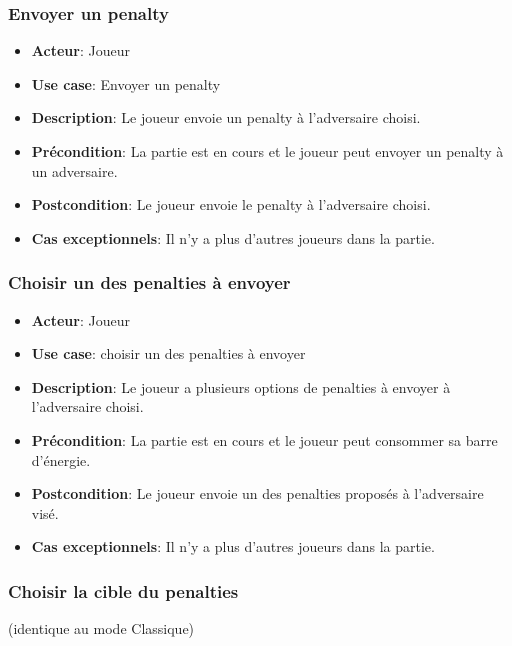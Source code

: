 \documentclass{article}
\begin{document}
\subsubsection*{Envoyer un penalty}
\begin{itemize}
    \item \textbf{Acteur}: Joueur
    \item \textbf{Use case}: Envoyer un penalty
    \item \textbf{Description}: Le joueur envoie un penalty à l'adversaire choisi.
    \item \textbf{Précondition}: La partie est en cours et le joueur peut envoyer un penalty à un adversaire.
    \item \textbf{Postcondition}: Le joueur envoie le penalty à l'adversaire choisi.
    \item \textbf{Cas exceptionnels}: Il n'y a plus d'autres joueurs dans la partie. 
\end{itemize}

\subsubsection*{Choisir un des penalties à envoyer}
\begin{itemize}
    \item \textbf{Acteur}: Joueur
    \item \textbf{Use case}: choisir un des penalties à envoyer
    \item \textbf{Description}: Le joueur a plusieurs options de penalties à envoyer à l'adversaire choisi.
    \item \textbf{Précondition}: La partie est en cours et le joueur peut consommer sa barre d'énergie.
    \item \textbf{Postcondition}: Le joueur envoie un des penalties proposés à l'adversaire visé.
    \item \textbf{Cas exceptionnels}: Il n'y a plus d'autres joueurs dans la partie.
\end{itemize}

\subsubsection*{Choisir la cible du penalties} (identique au mode Classique)
\end{document}
